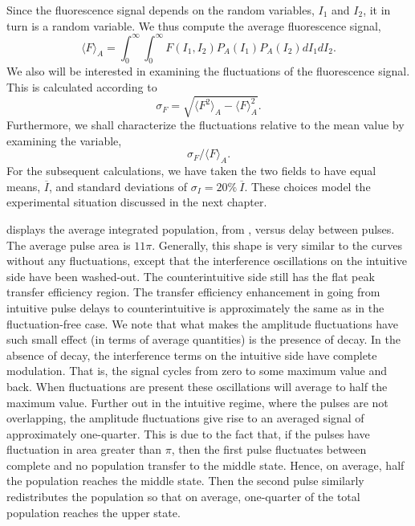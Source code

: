 Since the fluorescence signal depends on the random variables, $I_1$ and $I_2$,
it in turn is a random variable.  We thus compute the average fluorescence
signal,
\begin{equation}
\langle F \rangle_A = \int_0^{\infty}\!\!\int_0^{\infty} F(I_1,I_2)
P_A(I_1) P_A(I_2) dI_1 dI_2.
\label{F_A}
\end{equation}
We also will be interested in examining the fluctuations of the fluorescence
signal.  This is calculated according to
\begin{equation}
\sigma_F = \sqrt{\langle F^2 \rangle_A - \langle F \rangle_A^2}.
\end{equation}
Furthermore, we shall characterize the fluctuations relative to the mean value
by examining the variable, 
\begin{equation}
\sigma_F/\langle F \rangle_A.
\label{relative_fluc}
\end{equation}
For the subsequent
calculations, we have taken the two fields to have equal means, $\overline{I}$,
and standard deviations of $\sigma_I = 20\%\ \overline{I}$.  These choices
model the experimental situation discussed in the next chapter.

\begin{figure}[tbp]
\bigskip
{}
\end{figure}

 displays the average integrated population, from ,
versus delay between pulses.  The average pulse area is $11 \pi$.  Generally,
this shape is very similar to the curves without any fluctuations, except that
the interference oscillations on the intuitive side have been washed-out.  The
counterintuitive side still has the flat peak transfer efficiency region.  The
transfer efficiency enhancement in going from intuitive pulse delays to
counterintuitive is approximately the same as in the fluctuation-free case.  We
note that what makes the amplitude fluctuations have such small effect (in terms
of average quantities) is the presence of decay.  In the absence of decay, the
interference terms on the intuitive side have complete modulation.  That is, the
signal cycles from zero to some maximum value and back.  When fluctuations are
present these oscillations will average to half the maximum value.  Further out
in the intuitive regime, where the pulses are not overlapping, the amplitude
fluctuations give rise to an averaged signal of approximately one-quarter.  This
is due to the fact that, if the pulses have fluctuation in area greater than
$\pi$, then the first pulse fluctuates between complete and no population
transfer to the middle state.  Hence, on average, half the population reaches
the middle state.  Then the second pulse similarly redistributes the population
so that on average, one-quarter of the total population reaches the upper state.

